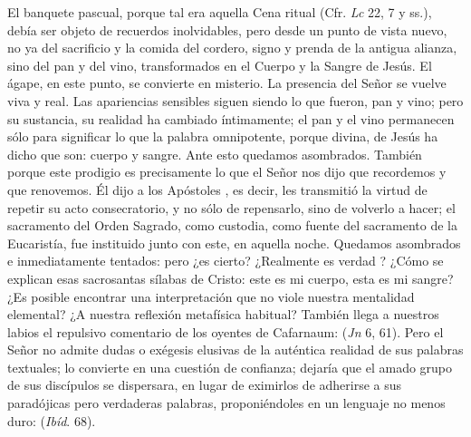 \begin{body}
El banquete pascual, porque tal era aquella Cena ritual (Cfr. \textit{Lc} 22, 7 y ss.), debía ser objeto de recuerdos inolvidables, pero desde un punto de vista nuevo, no ya del sacrificio y la comida del cordero, signo y prenda de la antigua alianza, sino del pan y del vino, transformados en el Cuerpo y la Sangre de Jesús. El ágape, en este punto, se convierte en misterio. La presencia del Señor se vuelve viva y real. Las apariencias sensibles siguen siendo lo que fueron, pan y vino; pero su sustancia, su realidad ha cambiado íntimamente; el pan y el vino permanecen sólo para significar lo que la palabra omnipotente, porque divina, de Jesús ha dicho que son: cuerpo y sangre. Ante esto quedamos asombrados. También porque este prodigio es precisamente lo que el Señor nos dijo que recordemos y que renovemos. Él dijo a los Apóstoles , es decir, les transmitió la virtud de repetir su acto consecratorio, y no sólo de repensarlo, sino de volverlo a hacer; el sacramento del Orden Sagrado, como custodia, como fuente del sacramento de la Eucaristía, fue instituido junto con este, en aquella noche. Quedamos asombrados e inmediatamente tentados: pero ¿es cierto? ¿Realmente es verdad ? ¿Cómo se explican esas sacrosantas sílabas de Cristo: este es mi cuerpo, esta es mi sangre? ¿Es posible encontrar una interpretación que no viole nuestra mentalidad elemental? ¿A nuestra reflexión metafísica habitual? También llega a nuestros labios el repulsivo comentario de los oyentes de Cafarnaum:  (\textit{Jn} 6, 61). Pero el Señor no admite dudas o exégesis elusivas de la auténtica realidad de sus palabras textuales; lo convierte en una cuestión de confianza; dejaría que el amado grupo de sus discípulos se dispersara, en lugar de eximirlos de adherirse a sus paradójicas pero verdaderas palabras, proponiéndoles en un lenguaje no menos duro:  (\textit{Ibíd}. 68). 
\end{body}


